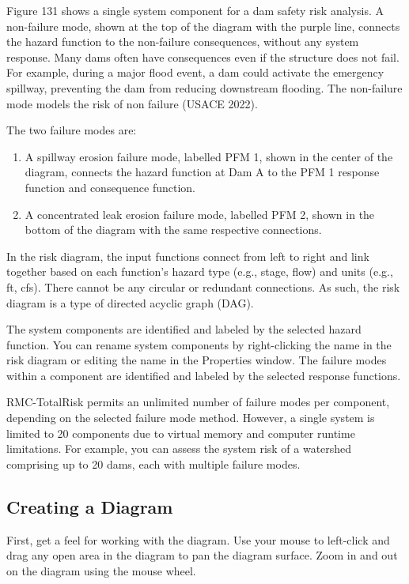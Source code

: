 \documentclass[
]{book}
\begin{document}
Figure 131 shows a single system component for a dam safety risk analysis. A non-failure mode, shown at the top of the diagram with the purple line, connects the hazard function to the non-failure consequences, without any system response. Many dams often have consequences even if the structure does not fail. For example, during a major flood event, a dam could activate the emergency spillway, preventing the dam from reducing downstream flooding. The non-failure mode models the risk of non failure (USACE 2022).

The two failure modes are:

\begin{enumerate}
\def\labelenumi{\arabic{enumi}.}
\item
  A spillway erosion failure mode, labelled PFM 1, shown in the center of the diagram, connects the hazard function at Dam A to the PFM 1 response function and consequence function.
\item
  A concentrated leak erosion failure mode, labelled PFM 2, shown in the bottom of the diagram with the same respective connections.
\end{enumerate}

In the risk diagram, the input functions connect from left to right and link together based on each function's hazard type (e.g., stage, flow) and units (e.g., ft, cfs). There cannot be any circular or redundant connections. As such, the risk diagram is a type of directed acyclic graph (DAG).

The system components are identified and labeled by the selected hazard function. You can rename system components by right-clicking the name in the risk diagram or editing the name in the Properties window. The failure modes within a component are identified and labeled by the selected response functions.

RMC-TotalRisk permits an unlimited number of failure modes per component, depending on the selected failure mode method. However, a single system is limited to 20 components due to virtual memory and computer runtime limitations. For example, you can assess the system risk of a watershed comprising up to 20 dams, each with multiple failure modes.

\hypertarget{creating-a-diagram}{%
\subsection{Creating a Diagram}\label{creating-a-diagram}}

First, get a feel for working with the diagram. Use your mouse to left-click and drag any open area in the diagram to pan the diagram surface. Zoom in and out on the diagram using the mouse wheel.
\end{document}
